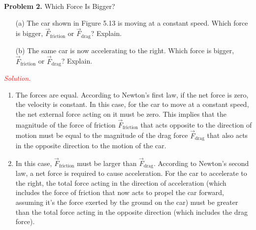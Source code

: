 \documentclass{report}
\begin{document}
    \pagebreak \bigbreak \noindent 
    \textbf{Problem 2.} Which Force Is Bigger?
    \bigbreak \noindent 
    \begin{enumerate}
        \item[(a)] The car shown in Figure 5.13 is moving at a constant speed. Which force is bigger, $\vec{F}_{\text{friction}}$ or $\vec{F}_{\text{drag}}$? Explain.
        \item[(b)] The same car is now accelerating to the right. Which force is bigger, $\vec{F}_{\text{friction}}$ or $\vec{F}_{\text{drag}}$? Explain.
    \end{enumerate}
    \bigbreak \noindent 
    \textcolor{red}{\textit{Solution.}}
    \begin{enumerate}[label=(\alph*)]
        \item The forces are equal. According to Newton's first law, if the net force is zero, the velocity is constant. In this case, for the car to move at a constant speed, the net external force acting on it must be zero. This implies that the magnitude of the force of friction $\vec{F}_{\text{friction}}$ that acts opposite to the direction of motion must be equal to the magnitude of the drag force $\vec{F}_{\text{drag}}$ that also acts in the opposite direction to the motion of the car.
        \item     In this case, $\vec{F}_{\text{friction}}$ must be larger than $\vec{F}_{\text{drag}}$. According to Newton's second law, a net force is required to cause acceleration. For the car to accelerate to the right, the total force acting in the direction of acceleration (which includes the force of friction that now acts to propel the car forward, assuming it's the force exerted by the ground on the car) must be greater than the total force acting in the opposite direction (which includes the drag force).
    \end{enumerate}
\end{document}
